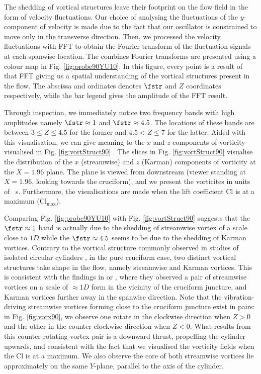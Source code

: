 \documentclass[a4paper,fleqn]{cas-sc}
\begin{document}
The shedding of vortical structures leave their footprint on the flow field in the form of velocity fluctuations. Our choice of analysing the fluctuations of the $y$-component of velocity is made due to the fact that our oscillator is constrained to move only in the transverse direction. Then, we processed the velocity fluctuations with FFT to obtain the Fourier transform of the fluctuation signals at each spanwise location. The combines Fourier transforms are presented using a colour map in Fig. \ref{fig:probe90YU10}. In this figure, every point is a result of that FFT giving us a spatial understanding of the vortical structures present in the flow. The abscissa and ordinates denotes $\fstr$ and $Z$ coordinates respectively, while the bar legend gives the amplitude of the FFT result.

Through inspection, we immediately notice two frequency bands with high amplitudes namely $\fstr \approx 1$ and $\fstr \approx 4.5$. The locations of these bands are between $3 \leq Z \leq 4.5$ for the former and $4.5 < Z \leq 7$ for the latter. Aided with this visualisation, we can give meaning to the $x$ and $z$-components of vorticity visualised in Fig. \ref{fig:vortStruct90} . The slices in Fig. \ref{fig:vortStruct90} visualise the distribution of the $x$ (streamwise) and $z$ (Karman) components of vorticity at the $X = 1.96$ plane. The plane is viewed from downstream (viewer standing at $X = 1.96$, looking towards the cruciform), and we present the vorticites in units of \si{\per\second}. Furthermore, the visualisations are made when the lift coefficient Cl is at a maximum ($\text{Cl}_{\text{max}}$).

Comparing Fig. \ref{fig:probe90YU10} with Fig. \ref{fig:vortStruct90} suggests that the $\fstr \approx 1$ band is actually due to the shedding of streamwise vortex of a scale close to $1D$ while the $\fstr \approx 4.5$ seems to be due to the shedding of Karman vortices. Contrary to the vortical structure commonly observed in studies of isolated circular cylinders \citep{Deng2007,Kinaci2016,Duranay2020}, in the pure cruciform case, two distinct vortical structures take shape in the flow, namely streamwise and Karman vortices. This is consistent with the findings in \citet{Koide2017} or \citet{Zhao2018a}, where they observed a pair of streamwise vortices on a scale of $\approx 1D$ form in the vicinity of the cruciform juncture, and Karman vortices further away in the spanwise direction. Note that the vibration-driving streamwise vortices forming close to the cruciform juncture exist in pairs: in Fig. \ref{fig:vorx90}, we observe one rotate in the clockwise direction when $Z > 0$ and the other in the counter-clockwise direction when $Z < 0$. What results from this counter-rotating vortex pair is a downward thrust, propelling the cylinder upwards, and consistent with the fact that we visualised the vorticity fields when the Cl is at a maximum. We also observe the core of both streamwise vortices lie approximately on the same $Y$-plane, parallel to the axis of the cylinder.
\end{document}
